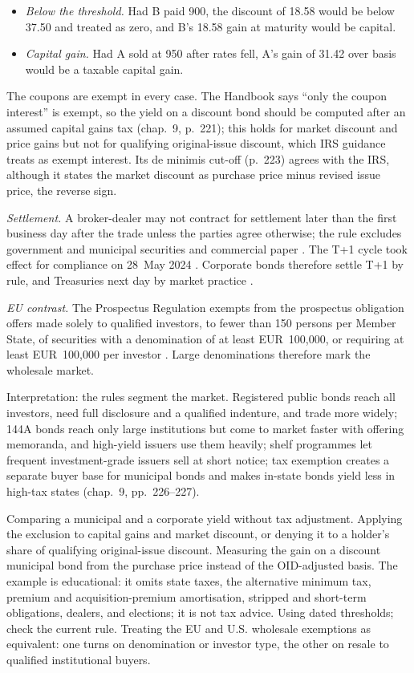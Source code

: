 \begin{qfrule}
\begin{itemize}
\item \emph{Below the threshold.} Had B paid 900, the discount of 18.58 would be below 37.50 and treated as zero, and B's 18.58 gain at maturity would be capital.
\item \emph{Capital gain.} Had A sold at 950 after rates fell, A's gain of 31.42 over basis would be a taxable capital gain.
\end{itemize}
The coupons are exempt in every case. The Handbook says ``only the coupon interest'' is exempt, so the yield on a discount bond should be computed after an assumed capital gains tax (chap.~9, p.~221); this holds for market discount and price gains but not for qualifying original-issue discount, which IRS guidance treats as exempt interest. Its de minimis cut-off (p.~223) agrees with the IRS, although it states the market discount as purchase price minus revised issue price, the reverse sign.

 \emph{Settlement.} A broker-dealer may not contract for settlement later than the first business day after the trade unless the parties agree otherwise; the rule excludes government and municipal securities and commercial paper \citep[para.~(a)]{cfr-17-240-15c6-1}. The T+1 cycle took effect for compliance on 28~May 2024 \citep[p.~1]{finra-regulatory-notice-23-15}. Corporate bonds therefore settle T+1 by rule, and Treasuries next day by market practice \citep[chap.~7, p.~180]{s7-fabozzifixed}.

\emph{EU contrast.} The Prospectus Regulation exempts from the prospectus obligation offers made solely to qualified investors, to fewer than 150 persons per Member State, of securities with a denomination of at least EUR~100{,}000, or requiring at least EUR~100{,}000 per investor \citep[art.~1(4)(a)--(d), consolidated text of 4~December~2024]{eu-2017-1129-prospectus}. Large denominations therefore mark the wholesale market.

 Interpretation: the rules segment the market. Registered public bonds reach all investors, need full disclosure and a qualified indenture, and trade more widely; 144A bonds reach only large institutions but come to market faster with offering memoranda, and high-yield issuers use them heavily; shelf programmes let frequent investment-grade issuers sell at short notice; tax exemption creates a separate buyer base for municipal bonds and makes in-state bonds yield less in high-tax states (chap.~9, pp.~226--227).

 Comparing a municipal and a corporate yield without tax adjustment. Applying the exclusion to capital gains and market discount, or denying it to a holder's share of qualifying original-issue discount. Measuring the gain on a discount municipal bond from the purchase price instead of the OID-adjusted basis. The example is educational: it omits state taxes, the alternative minimum tax, premium and acquisition-premium amortisation, stripped and short-term obligations, dealers, and elections; it is not tax advice. Using dated thresholds; check the current rule. Treating the EU and U.S. wholesale exemptions as equivalent: one turns on denomination or investor type, the other on resale to qualified institutional buyers.


\end{qfrule}
